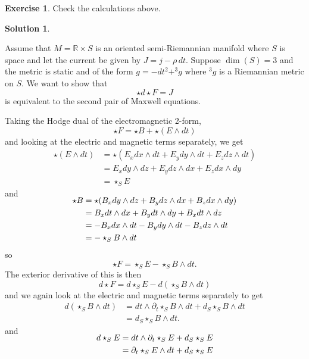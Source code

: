 \documentclass[11pt, a4paper]{report}
\theoremstyle{definition}
\newtheorem{ex}{Exercise}[part]
\newtheorem{sol}{Solution}[part]
\begin{document}
\begin{ex}

Check the calculations above.

\end{ex}

\begin{sol}\label{sol:secondpair}

Assume that $M = \mathbb{R} \times S$ is an oriented semi-Riemannian manifold where $S$ is space and let the current be given by $J = j - \rho \, dt$. Suppose $\dim(S) = 3$ and the metric is static and of the form $g = -dt^2 + ^3 g$ where $^3 g$ is a Riemannian metric on $S$. We want to show that
\[
    \star d \star F = J
\]
is equivalent to the second pair of Maxwell equations.

Taking the Hodge dual of the electromagnetic 2-form,
\[
    \star F = \star B + \star (E \wedge dt)
\]
and looking at the electric and magnetic terms separately, we get
\begin{align*}
    \star (E \wedge dt) &= \star (E_x dx \wedge dt + E_y dy \wedge dt + E_z dz \wedge dt) \\
        &= E_x dy \wedge dz + E_y dz \wedge dx + E_z dx \wedge dy \\
        &= \star_S E
\end{align*}
and
\begin{align*}
    \SwapAboveDisplaySkip
    \star B &= \star (B_x dy \wedge dz + B_y dz \wedge dx + B_z dx \wedge dy) \\
            &= B_x dt \wedge dx + B_y dt \wedge dy + B_x dt \wedge dz \\
            &= - B_x dx \wedge dt - B_y dy \wedge dt - B_z dz \wedge dt \\
            &= - \star_S B \wedge dt
\end{align*}
so
\[
    \star F = \star_S E - \star_S B \wedge dt.
\]
The exterior derivative of this is then
\[
    d \star F = d \star_S E - d (\star_S B \wedge dt)
\]
and we again look at the electric and magnetic terms separately to get
\begin{align*}
     d (\star_S B \wedge dt) &= dt \wedge \partial_t \star_S B \wedge dt + d_S \star_S B \wedge dt \\
        &= d_S \star_S B \wedge dt.
\end{align*}
and
\begin{align*}
    \SwapAboveDisplaySkip
    d \star_S E &= dt \wedge \partial_t \star_S E + d_S \star_S E \\
        &= \partial_t \star_S E \wedge dt + d_S \star_S E \\

\end{align*}
\end{sol}
\end{document}
